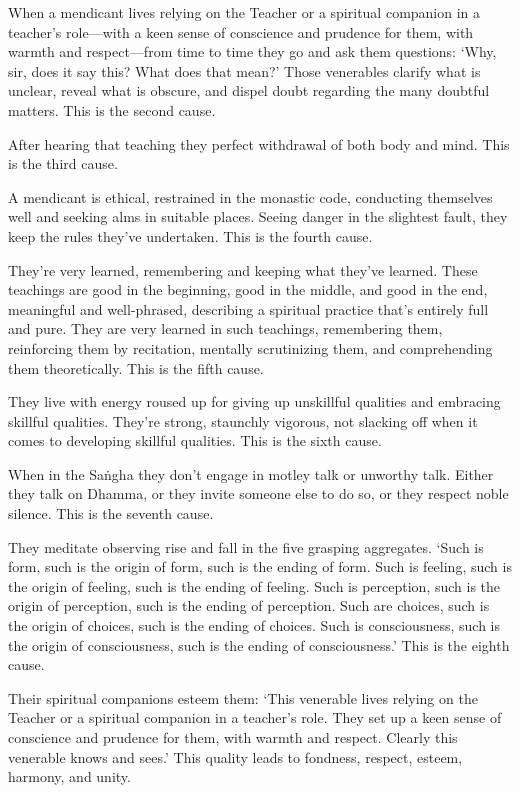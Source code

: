 \documentclass[12pt,openany]{book}%
\begin{document}
When a mendicant lives relying on the Teacher or a spiritual companion in a teacher’s role—with a keen sense of conscience and prudence for them, with warmth and respect—from time to time they go and ask them questions: ‘Why, sir, does it say this? What does that mean?’ Those venerables clarify what is unclear, reveal what is obscure, and dispel doubt regarding the many doubtful matters. This is the second cause. 

After hearing that teaching they perfect withdrawal of both body and mind. This is the third cause. 

A mendicant is ethical, restrained in the monastic code, conducting themselves well and seeking alms in suitable places. Seeing danger in the slightest fault, they keep the rules they’ve undertaken. This is the fourth cause. 

They’re very learned, remembering and keeping what they’ve learned. These teachings are good in the beginning, good in the middle, and good in the end, meaningful and well-phrased, describing a spiritual practice that’s entirely full and pure. They are very learned in such teachings, remembering them, reinforcing them by recitation, mentally scrutinizing them, and comprehending them theoretically. This is the fifth cause. 

They live with energy roused up for giving up unskillful qualities and embracing skillful qualities. They’re strong, staunchly vigorous, not slacking off when it comes to developing skillful qualities. This is the sixth cause. 

When in the \textsanskrit{Saṅgha} they don’t engage in motley talk or unworthy talk. Either they talk on Dhamma, or they invite someone else to do so, or they respect noble silence. This is the seventh cause. 

They meditate observing rise and fall in the five grasping aggregates. ‘Such is form, such is the origin of form, such is the ending of form. Such is feeling, such is the origin of feeling, such is the ending of feeling. Such is perception, such is the origin of perception, such is the ending of perception. Such are choices, such is the origin of choices, such is the ending of choices. Such is consciousness, such is the origin of consciousness, such is the ending of consciousness.’ This is the eighth cause. 

Their spiritual companions esteem them: ‘This venerable lives relying on the Teacher or a spiritual companion in a teacher’s role. They set up a keen sense of conscience and prudence for them, with warmth and respect. Clearly this venerable knows and sees.’ This quality leads to fondness, respect, esteem, harmony, and unity. 
\end{document}

